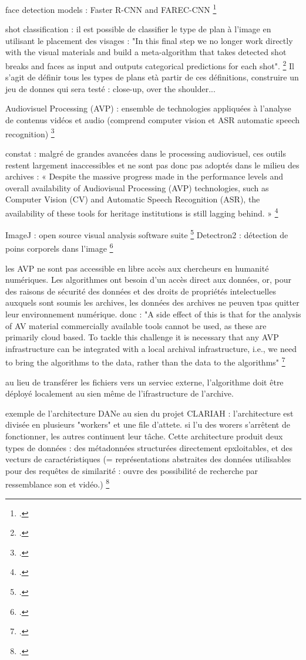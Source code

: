 \begin{itemize}
	face detection models : Faster R-CNN and FAREC-CNN \footcite{arnold2019}
	
	shot classification : il est possible de classifier le type de plan à l'image en utilisant le placement des visages : "In this final step we no longer work directly with the visual materials and build a meta-algorithm that takes detected shot breaks and faces as input and outputs categorical predictions for each shot". \footcite{arnold2019}
	Il s'agit de définir tous les types de plans età partir de ces définitions, construire un jeu de donnes qui sera testé : close-up, over the shoulder...
	
	Audiovisuel Processing (AVP) : ensemble de technologies appliquées à l'analyse de contenus vidéos et audio (comprend computer vision et ASR automatic speech recognition) 
	\footcite{noord2021}
	
	constat : malgré de grandes avancées dans le processing audiovisuel, ces outils restent largement inaccessibles et ne sont pas donc pas adoptés dans le milieu des archives : « Despite the massive progress made in the performance levels and overall availability of Audiovisual Processing (AVP) technologies, such as Computer Vision (CV) and Automatic Speech Recognition (ASR), the availability of these tools for heritage institutions is still lagging behind. »
	\footcite{noord2021}
	
	ImageJ : open source visual analysis software suite 
	\footcite{noord2021}
	Detectron2 : détection de poins corporels dans l'image \footcite{noord2021}
	
	les AVP ne sont pas accessible en libre accès aux chercheurs en humanité numériques. Les algorithmes ont besoin d'un accès direct aux données, or, pour des raisons de sécurité des données et des droits de propriétés intelectuelles auxquels sont soumis les archives, les données des archives ne peuven tpas quitter leur environnement numérique. 
	donc : "A side effect of this is that for the analysis of AV material commercially available tools cannot be used, as these are primarily cloud based. To tackle this challenge it is necessary that any AVP infrastructure can
	be integrated with a local archival infrastructure, i.e.,
	we need to bring the algorithms to the data, rather than
	the data to the algorithms"
	\footcite{noord2021}
	
	au lieu de transférer les fichiers vers un serviec externe, l'algorithme doit être déployé localement au sien même de l'ifrastructure de l'archive. 
	
	exemple de l'architecture DANe au sien du projet CLARIAH : l'architecture est divisée en plusieurs "workers" et une file d'attete. si l'u des worers s'arrêtent de fonctionner, les autres continuent leur tâche. 
	Cette architecture produit deux types de données : des métadonnées structurées directement epxloitables, et des vecturs de caractéristiques (= représentations abstraites des données utilisables pour des requêtes de similarité : ouvre des possibilité de recherche par ressemblance son et vidéo.)
	\footcite{noord2021}
	

\end{itemize}
